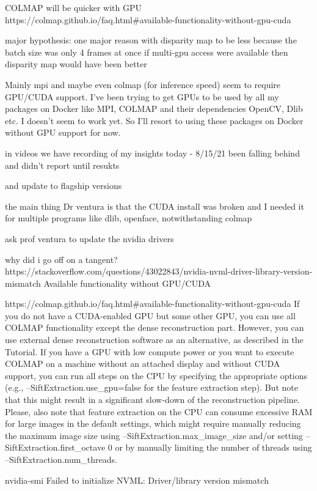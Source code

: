 COLMAP will be quicker with GPU
https://colmap.github.io/faq.html#available-functionality-without-gpu-cuda

major hypothesis: one major reason with disparity map to be less because the batch size was only 4 frames at once   
if multi-gpu access were available then disparity map would have been better 

Mainly mpi and maybe even colmap (for inference speed) seem to require GPU/CUDA support. I've been trying to get GPUs to be used by all my packages on Docker like MPI, COLMAP and their dependencies OpenCV, Dlib etc.
I doesn't seem to work yet. So I'll resort to using these packages on Docker without GPU support for now. 

in videos we have recording of my insights today - 8/15/21
been falling behind and didn't report until resukts 

and update to flagship versions

the main thing Dr ventura is that the CUDA install was broken and I needed it for multiple programs like dlib, openface, notwithstanding colmap 

ask prof ventura to update the nvidia drivers 

why did i go off on a tangent?
https://stackoverflow.com/questions/43022843/nvidia-nvml-driver-library-version-mismatch
Available functionality without GPU/CUDA

https://colmap.github.io/faq.html#available-functionality-without-gpu-cuda
If you do not have a CUDA-enabled GPU but some other GPU, you can use all COLMAP functionality except the dense reconstruction part. However, you can use external dense reconstruction software as an alternative, as described in the Tutorial. If you have a GPU with low compute power or you want to execute COLMAP on a machine without an attached display and without CUDA support, you can run all steps on the CPU by specifying the appropriate options (e.g., --SiftExtraction.use_gpu=false for the feature extraction step). But note that this might result in a significant slow-down of the reconstruction pipeline. Please, also note that feature extraction on the CPU can consume excessive RAM for large images in the default settings, which might require manually reducing the maximum image size using --SiftExtraction.max_image_size and/or setting --SiftExtraction.first_octave 0 or by manually limiting the number of threads using --SiftExtraction.num_threads.

nvidia-smi
Failed to initialize NVML: Driver/library version mismatch



